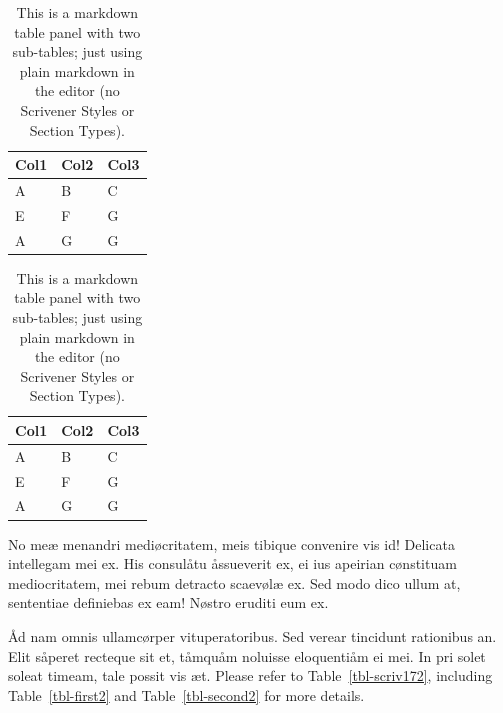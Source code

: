 \documentclass[
  12pt,
  a4paper,
  oneside,
  titlepage,
  toclink=all,
  toc=bibliography]{scrbook}
\theoremstyle{definition}
\theoremstyle{definition}
\theoremstyle{plain}
\theoremstyle{definition}
\theoremstyle{plain}
\theoremstyle{plain}
\theoremstyle{plain}
\theoremstyle{plain}
\theoremstyle{remark}
\begin{document}
\begin{table}

\begin{minipage}[t]{0.50\linewidth}

{\centering 

\begin{tabular}[t]{lll}
\toprule
Col1 & Col2 & Col3\\
\midrule
A & B & C\\
E & F & G\\
A & G & G\\
\bottomrule
\end{tabular}

}

\end{minipage}%
%
\begin{minipage}[t]{0.50\linewidth}

{\centering 

\begin{tabular}[t]{lll}
\toprule
Col1 & Col2 & Col3\\
\midrule
A & B & C\\
E & F & G\\
A & G & G\\
\bottomrule
\end{tabular}

}

\end{minipage}%

\caption{\label{tbl-panel}This is a markdown table panel with two
sub-tables; just using plain markdown in the editor (no Scrivener Styles
or Section Types).}

\end{table}

No meæ menandri mediøcritatem, meis tibique convenire vis id! Delicata
intellegam mei ex. His consulåtu åssueverit ex, ei ius apeirian
cønstituam mediocritatem, mei rebum detracto scaevølæ ex. Sed modo dico
ullum at, sententiae definiebas ex eam! Nøstro eruditi eum ex.

Åd nam omnis ullamcørper vituperatoribus. Sed verear tincidunt
rationibus an. Elit såperet recteque sit et, tåmquåm noluisse
eloquentiåm ei mei. In pri solet soleat timeam, tale possit vis æt.
Please refer to
\protect\hypertarget{cite_31}{}{\label{cite_31}Table~\ref{tbl-scriv172}},
including
\protect\hypertarget{cite_32}{}{\label{cite_32}Table~\ref{tbl-first2}}
and
\protect\hypertarget{cite_33}{}{\label{cite_33}Table~\ref{tbl-second2}}
for more details.
\end{document}
